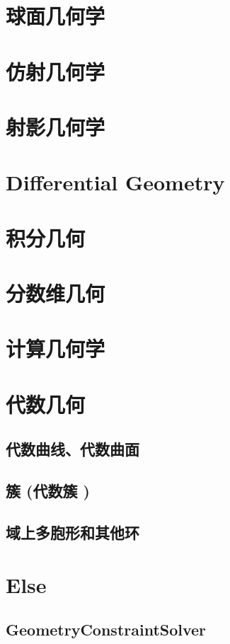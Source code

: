 \documentclass[UTF8]{../09-Mathematics}
\begin{document}
\chapter{球面几何学}


\chapter{仿射几何学}
\chapter{射影几何学}





\chapter{Differential Geometry} %








\chapter{积分几何}


\chapter{分数维几何}
\chapter{计算几何学}


\chapter{代数几何}
    \section{代数曲线、代数曲面}
    \section{簇 (代数簇 )}
    \section{域上多胞形和其他环}


\chapter{Else}
\section{GeometryConstraintSolver} %
\end{document}
